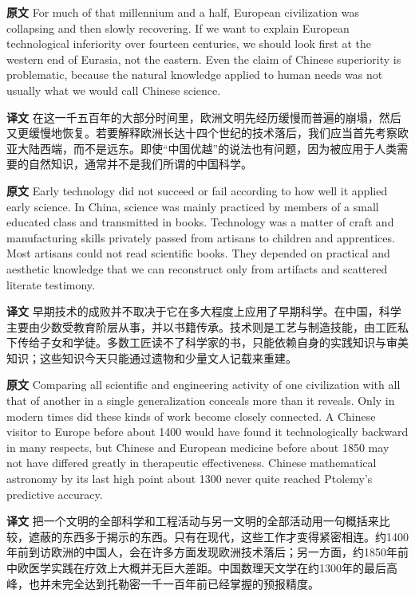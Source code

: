 \documentclass[UTF8,zihao=-4]{ctexart}
\newcommand{\BodyFont}{\fontsize{10.5pt}{15.5pt}\selectfont}
\newcommand{\origlabel}{\textbf{原文}\quad}
\newcommand{\translabel}{\textbf{译文}\quad}
\newenvironment{enblock}{\par\noindent\begingroup\BodyFont\origlabel}{\par\endgroup}
\newenvironment{zhblock}{\par\noindent\begingroup\BodyFont\translabel}{\par\endgroup\vspace{0.35em}}
\begin{document}
\begin{enblock}
For much of that millennium and a half, European civilization was collapsing and then slowly recovering. If we want to explain European technological inferiority over fourteen centuries, we should look first at the western end of Eurasia, not the eastern. Even the claim of Chinese superiority is problematic, because the natural knowledge applied to human needs was not usually what we would call Chinese science.
\end{enblock}
\begin{zhblock}
在这一千五百年的大部分时间里，欧洲文明先经历缓慢而普遍的崩塌，然后又更缓慢地恢复。若要解释欧洲长达十四个世纪的技术落后，我们应当首先考察欧亚大陆西端，而不是远东。即使“中国优越”的说法也有问题，因为被应用于人类需要的自然知识，通常并不是我们所谓的中国科学。
\end{zhblock}

\begin{enblock}
Early technology did not succeed or fail according to how well it applied early science. In China, science was mainly practiced by members of a small educated class and transmitted in books. Technology was a matter of craft and manufacturing skills privately passed from artisans to children and apprentices. Most artisans could not read scientific books. They depended on practical and aesthetic knowledge that we can reconstruct only from artifacts and scattered literate testimony.
\end{enblock}
\begin{zhblock}
早期技术的成败并不取决于它在多大程度上应用了早期科学。在中国，科学主要由少数受教育阶层从事，并以书籍传承。技术则是工艺与制造技能，由工匠私下传给子女和学徒。多数工匠读不了科学家的书，只能依赖自身的实践知识与审美知识；这些知识今天只能通过遗物和少量文人记载来重建。
\end{zhblock}

\begin{enblock}
Comparing all scientific and engineering activity of one civilization with all that of another in a single generalization conceals more than it reveals. Only in modern times did these kinds of work become closely connected. A Chinese visitor to Europe before about 1400 would have found it technologically backward in many respects, but Chinese and European medicine before about 1850 may not have differed greatly in therapeutic effectiveness. Chinese mathematical astronomy by its last high point about 1300 never quite reached Ptolemy's predictive accuracy.
\end{enblock}
\begin{zhblock}
把一个文明的全部科学和工程活动与另一文明的全部活动用一句概括来比较，遮蔽的东西多于揭示的东西。只有在现代，这些工作才变得紧密相连。约1400年前到访欧洲的中国人，会在许多方面发现欧洲技术落后；另一方面，约1850年前中欧医学实践在疗效上大概并无巨大差距。中国数理天文学在约1300年的最后高峰，也并未完全达到托勒密一千一百年前已经掌握的预报精度。
\end{zhblock}
\end{document}
